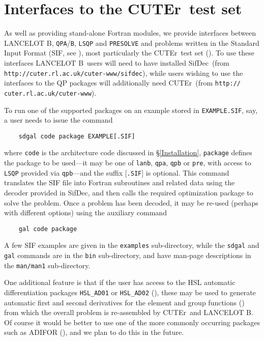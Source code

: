 \documentclass[twoside]{article}
\newcommand{\lanb}{{\sf LANCELOT B}}
\newcommand{\cuter}{{\sf CUTEr}}
\newcommand{\sifdec}{{\sf SifDec}}
\begin{document}
\section{Interfaces to the \cuter\ test set}

As well as providing stand-alone Fortran modules, we provide
interfaces between \lanb, {\tt QPA}/{\tt B}, {\tt LSQP} and {\tt PRESOLVE} and
problems written in the Standard Input Format (SIF, see
), most particularly
the \cuter\ test set (). To use these
interfaces \lanb\ users will need to have installed
\sifdec\ (from {\tt http://cuter.rl.ac.uk/cuter-www/sifdec}),
while users wishing to use the interfaces to the QP packages
will additionally need \cuter\
(from  {\tt http:// cuter.rl.ac.uk/cuter-www}).

To run one of the supported packages on an example stored in
{\tt EXAMPLE.SIF}, say, a user needs to issue the command
\begin{verbatim}
    sdgal code package EXAMPLE[.SIF]
\end{verbatim}
where {\tt code} is the architecture code discussed in \S\ref{Installation},
{\tt package} defines the package to be used---it may be one of {\tt lanb},
{\tt qpa}, {\tt qpb} or {\tt pre}, with access to {\tt LSQP}
provided via {\tt qpb}---and the suffix [{\tt .SIF}] is optional.
This command translates the SIF file into Fortran subroutines and
related data using the decoder provided in \sifdec, and then calls
the required optimization package to solve the problem. Once a problem
has been decoded, it may be re-used (perhaps with different options)
using the auxiliary command
\begin{verbatim}
    gal code package
\end{verbatim}
A few SIF examples are given in the {\tt examples} sub-directory, while the
{\tt sdgal} and {\tt gal} commands are in the {\tt bin} sub-directory, and
have man-page descriptions in the {\tt man/man1} sub-directory.

One additional feature is that if the user has
access to the HSL automatic differentiation packages {\tt HSL\_AD01}
or {\tt HSL\_AD02} (\bciteb{PrycReid98}),
these may be used to generate automatic first and second derivatives
for the element and group functions (\bciteb{ConnGoulToin92})
from which the overall problem is re-assembled by \cuter\ and \lanb.
Of course it would be better to use one of the more
commonly occurring packages
such as  ADIFOR (),
and we plan to do this in the future.
\end{document}
